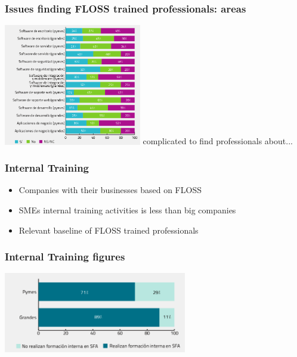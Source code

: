 \documentclass{beamer}
\begin{document}

\begin{frame}
\frametitle{Issues finding FLOSS trained professionals: areas}
\begin{center}
  \includegraphics[width=6cm]{figs/cenatic_trainedprofessionals.png}
 complicated to find professionals about...
\end{center}
\end{frame}


\begin{frame}
\frametitle{Internal Training}
\begin{itemize}
\item Companies with their businesses based on FLOSS
\item SMEs internal training activities is less than big companies
\item Relevant baseline of FLOSS trained professionals
\end{itemize}
\end{frame}


\begin{frame}
\frametitle{Internal Training figures}
\begin{center}
  \includegraphics[width=8cm]{figs/cenatic_internaltraining.png}
\end{center}
\end{frame}

\end{document}
